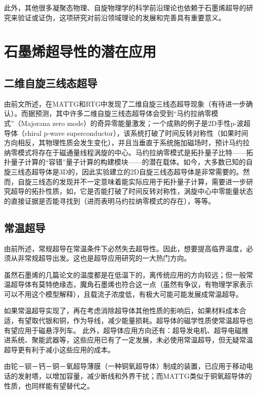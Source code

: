 此外，其他很多凝聚态物理、自旋物理学的科学前沿理论也依赖于石墨烯超导的研究来验证或证伪，这项研究对前沿领域理论的发展和完善具有重要意义。

\section{石墨烯超导性的潜在应用}

\subsection{二维自旋三线态超导}

由前文所述，在MATTG和RTG中发现了二维自旋三线态超导现象（有待进一步确认）。而据预测，其中许多二维自旋三线态超导体会受到“马约拉纳零模式”（Majorana zero mode）的奇异零能量激发；一个成熟的例子是2D手性p-波超导体（chiral p-wave superconductor），该系统打破了时间反转对称性（如果时间方向相反，其物理性质会发生变化），并且当垂直于系统施加磁场时，预计马约拉纳零模式将存在于磁通量线程涡旋的中心。马约拉纳零模式是拓扑量子比特——拓扑量子计算的“容错”量子计算的构建模块——的潜在载体。如今，大多数已知的自旋三线态超导体是3D的，因此实验建立的2D自旋三线态超导体是非常需要的。然而，自旋三线态的发现并不一定意味着能实际应用于拓扑量子计算，需要进一步研究超导的拓扑性质，如，它是否能打破了时间反转对称性，涡旋中心中零能量状态的直接证据是否能寻找到（进而表明马约拉纳零模式的存在），等等。\cite{RN51}

\subsection{常温超导}

由前所述，常规超导在常温条件下必然失去超导性。因此，想要提高临界温度，必须从非常规超导出发。这也是超导应用研究的一大热门方向。

虽然石墨烯的几篇论文的温度都是在低温下的，离传统应用的方向较远；但一般常温超导体有莫特绝缘态\cite{RN54}，魔角石墨烯也符合这一点（虽然有争议，有物理学家表示可以不用这个模型解释），且载流子浓度低，有极大可能可能发展成常温超导。

如果常温超导实现了，再在考虑消除超导体其他性质的影响后，如果材料成本合适，有望取代银和铜，作为导线，减少能量损耗。超导体的磁学性质使常温超导也有望应用于磁悬浮列车。
此外，超导体应用方向还有：超导发电机、超导电磁推进系统、聚能武器等，这些应用已有了一定发展，未必使用常温超导，但无疑常温超导更有利于减小这些应用的成本。

由铊－钡－钙－铜－氧超导薄膜（一种铜氧超导体）制成的装置，已应用于移动电话的发射塔，以增加容量，减少断线和外界干扰；而MATTG类似于铜氧超导体的性质，也同样能有望替代之。